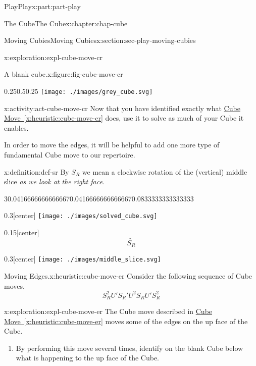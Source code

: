 \documentclass[oneside,10pt,]{book}
\newcommand{\xreffont}{\relax}
\numberwithin{equation}{section}
\begin{document}
\begin{partptx}{Play}{}{Play}{}{}{x:part:part-play}
\begin{chapterptx}{The Cube}{}{The Cube}{}{}{x:chapter:chap-cube}
\begin{sectionptx}{Moving Cubies}{}{Moving Cubies}{}{}{x:section:sec-play-moving-cubies}
\begin{exploration}{}{x:exploration:expl-cube-move-cr}
\begin{figureptx}{A blank cube.}{x:figure:fig-cube-move-cr}{}
\begin{image}{0.25}{0.5}{0.25}%
\texttt{[image: ./images/grey\_cube.svg]}
\end{image}%
\tcblower
\end{figureptx}%
\end{exploration}%
\begin{activity}{}{x:activity:act-cube-move-cr}%
Now that you have identified exactly what \hyperref[x:heuristic:cube-move-cr]{Cube Move~{\xreffont\ref{x:heuristic:cube-move-cr}}} does, use it to solve as much of your Cube it enables.%
\end{activity}%
In order to move the edges, it will be helpful to add one more type of fundamental Cube move to our repertoire.%
\begin{definition}{}{x:definition:def-sr}%
%
By \(S_R\) we mean a clockwise rotation of the (vertical) middle slice \emph{as we look at the right face}.%
\begin{sidebyside}{3}{0.0416666666666667}{0.0416666666666667}{0.0833333333333333}%
\begin{sbspanel}{0.3}[center]%
\texttt{[image: ./images/solved\_cube.svg]}
\end{sbspanel}%
\begin{sbspanel}{0.15}[center]%
%
\begin{equation*}
\underrightarrow{\quad S_R\quad}
\end{equation*}
%
\end{sbspanel}%
\begin{sbspanel}{0.3}[center]%
\texttt{[image: ./images/middle\_slice.svg]}
\end{sbspanel}%
\end{sidebyside}%
\end{definition}
\begin{heuristic}{Moving Edges.}{}{x:heuristic:cube-move-er}%
%
Consider the following sequence of Cube moves.%
%
\begin{equation*}
S_R^2 U' S_R' U^2 S_R U' S_R^2
\end{equation*}
\end{heuristic}
\begin{exploration}{}{x:exploration:expl-cube-move-er}%
The Cube move described in \hyperref[x:heuristic:cube-move-er]{Cube Move~{\xreffont\ref{x:heuristic:cube-move-er}}} moves some of the edges on the up face of the Cube.%
%
\begin{enumerate}
\item{}By performing this move several times, identify on the blank Cube below what is happening to the up face of the Cube.%

\end{enumerate}
\end{exploration}
\end{sectionptx}
\end{chapterptx}
\end{partptx}
\end{document}
